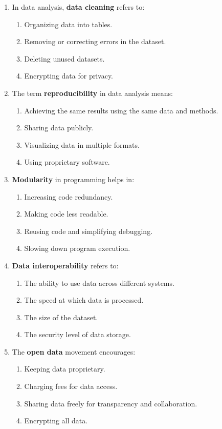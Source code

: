 \documentclass[twocolumn]{article}
\begin{document}
\begin{enumerate}
\item In data analysis, \textbf{data cleaning} refers to:
\begin{enumerate}
    \item Organizing data into tables.
    \item Removing or correcting errors in the dataset.
    \item Deleting unused datasets.
    \item Encrypting data for privacy.
\end{enumerate}

\item The term \textbf{reproducibility} in data analysis means:
\begin{enumerate}
    \item Achieving the same results using the same data and methods.
    \item Sharing data publicly.
    \item Visualizing data in multiple formats.
    \item Using proprietary software.
\end{enumerate}

\item \textbf{Modularity} in programming helps in:
\begin{enumerate}
    \item Increasing code redundancy.
    \item Making code less readable.
    \item Reusing code and simplifying debugging.
    \item Slowing down program execution.
\end{enumerate}

\item \textbf{Data interoperability} refers to:
\begin{enumerate}
    \item The ability to use data across different systems.
    \item The speed at which data is processed.
    \item The size of the dataset.
    \item The security level of data storage.
\end{enumerate}

\item The \textbf{open data} movement encourages:
\begin{enumerate}
    \item Keeping data proprietary.
    \item Charging fees for data access.
    \item Sharing data freely for transparency and collaboration.
    \item Encrypting all data.
\end{enumerate}


\end{enumerate}
\end{document}

